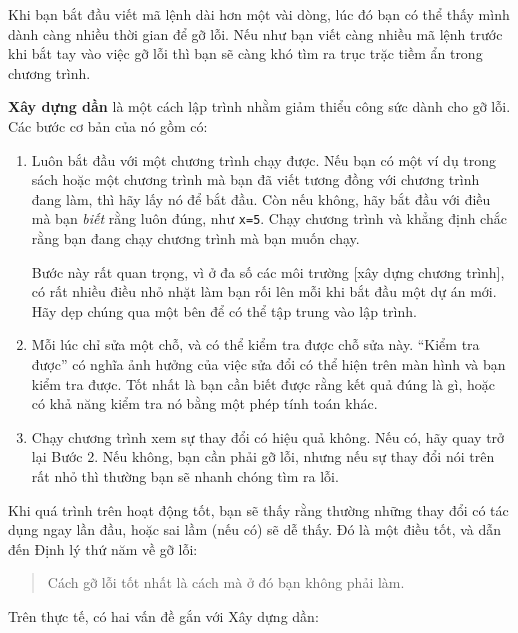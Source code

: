 \documentclass[12pt]{book}
\begin{document}
Khi bạn bắt đầu viết mã lệnh dài hơn một vài dòng, lúc đó bạn
có thể thấy mình dành càng nhiều thời gian để gỡ lỗi. Nếu như
bạn viết càng nhiều mã lệnh trước khi bắt tay vào việc gỡ lỗi
thì bạn sẽ càng khó tìm ra trục trặc tiềm ẩn trong chương trình.

{\bf Xây dựng dần} là một cách lập trình nhằm giảm thiểu
công sức dành cho gỡ lỗi. Các bước cơ bản của nó gồm có:

\begin{enumerate}

\item Luôn bắt đầu với một chương trình chạy được. Nếu bạn 
có một ví dụ trong sách hoặc một chương trình mà bạn đã viết
tương đồng với chương trình đang làm, thì hãy lấy nó để bắt
đầu. Còn nếu không, hãy bắt đầu với điều mà bạn {\em biết}
rằng luôn đúng, như {\tt x=5}.  Chạy chương trình và khẳng định
chắc rằng bạn đang chạy chương trình mà bạn muốn chạy.

Bước này rất quan trọng, vì ở đa số các môi trường [xây dựng 
chương trình], có rất nhiều điều nhỏ nhặt làm bạn rối lên mỗi
khi bắt đầu một dự án mới. Hãy dẹp chúng qua một bên để
có thể tập trung vào lập trình.

\item Mỗi lúc chỉ sửa một chỗ, và có thể kiểm tra được chỗ sửa này.
``Kiểm tra được'' có nghĩa ảnh hưởng của việc sửa đổi có thể 
hiện trên màn hình và bạn kiểm tra được. Tốt nhất là bạn cần
biết được rằng kết quả đúng là gì, hoặc có khả năng kiểm tra nó
bằng một phép tính toán khác.

\item Chạy chương trình xem sự thay đổi có hiệu quả không. Nếu
có, hãy quay trở lại Bước 2. Nếu không, bạn cần phải gỡ lỗi, nhưng
nếu sự thay đổi nói trên rất nhỏ thì thường bạn sẽ nhanh chóng
tìm ra lỗi.

\end{enumerate}

Khi quá trình trên hoạt động tốt, bạn sẽ thấy rằng thường những
thay đổi có tác dụng ngay lần đầu, hoặc sai lầm (nếu có) sẽ dễ 
thấy. Đó là một điều tốt, và dẫn đến Định lý thứ năm về gỡ lỗi:

\begin{quote}
Cách gỡ lỗi tốt nhất là cách mà ở đó bạn không phải làm.
\end{quote}

Trên thực tế, có hai vấn đề gắn với Xây dựng dần:
\end{document}
